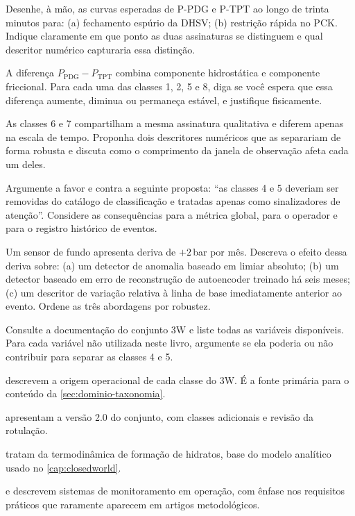 \begin{exercicios}
\item Desenhe, à mão, as curvas esperadas de P-PDG e P-TPT ao longo de trinta minutos
      para: (a) fechamento espúrio da DHSV; (b) restrição rápida no PCK. Indique
      claramente em que ponto as duas assinaturas se distinguem e qual descritor
      numérico capturaria essa distinção.

\item A diferença $P_{\text{PDG}} - P_{\text{TPT}}$ combina componente hidrostática e
      componente friccional. Para cada uma das classes 1, 2, 5 e 8, diga se você espera
      que essa diferença aumente, diminua ou permaneça estável, e justifique fisicamente.

\item As classes 6 e 7 compartilham a mesma assinatura qualitativa e diferem apenas na
      escala de tempo. Proponha dois descritores numéricos que as separariam de forma
      robusta e discuta como o comprimento da janela de observação afeta cada um deles.

\item Argumente a favor e contra a seguinte proposta: ``as classes 4 e 5 deveriam ser
      removidas do catálogo de classificação e tratadas apenas como sinalizadores de
      atenção''. Considere as consequências para a métrica global, para o operador e
      para o registro histórico de eventos.

\item Um sensor de fundo apresenta deriva de $+2$\,bar por mês. Descreva o efeito
      dessa deriva sobre: (a) um detector de anomalia baseado em limiar absoluto;
      (b) um detector baseado em erro de reconstrução de autoencoder treinado há seis
      meses; (c) um descritor de variação relativa à linha de base imediatamente
      anterior ao evento. Ordene as três abordagens por robustez.

\item Consulte a documentação do conjunto 3W \citep{VazVargas2026_3w2} e liste todas as
      variáveis disponíveis. Para cada variável não utilizada neste livro, argumente se
      ela poderia ou não contribuir para separar as classes 4 e 5.
\end{exercicios}

\begin{leituras}
\item \citet{VARGAS2019} descrevem a origem operacional de cada classe do 3W. É a fonte
      primária para o conteúdo da \cref{sec:dominio-taxonomia}.
\item \citet{VazVargas2026_3w2} apresentam a versão 2.0 do conjunto, com classes
      adicionais e revisão da rotulação.
\item \citet{Safamirzaei2015} tratam da termodinâmica de formação de hidratos, base do
      modelo analítico usado no \cref{cap:closedworld}.
\item \citet{aranha2023system} e \citet{Aranha2024} descrevem sistemas de monitoramento
      em operação, com ênfase nos requisitos práticos que raramente aparecem em
      artigos metodológicos.
\end{leituras}
